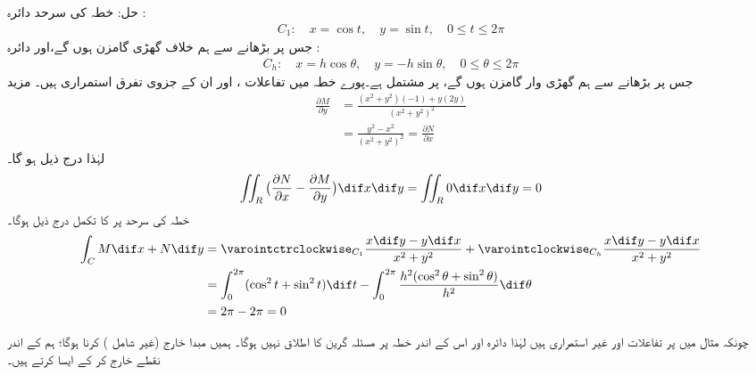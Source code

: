  حل:\quad
 خطہ   کی سرحد دائرہ :
\begin{align*}
 C_1:\quad  x=\cos t,\quad  y= \sin t,\quad 0\leq t \leq 2\pi 
\end{align*}
   جس پر    بڑھانے سے ہم  خلاف گھڑی گامزن ہوں گے،اور دائرہ :
\begin{align*}
  C_h:\quad  x=h\cos \theta,\quad  y= -h\sin\theta,\quad 0\leq \theta \leq 2\pi  
\end{align*}
جس پر    بڑھانے سے ہم  گھڑی وار  گامزن ہوں گے، پر مشتمل ہے۔پورے  خطہ  میں تفاعلات   ،   اور ان کے جزوی تفرق استمراری ہیں۔ مزید  
\begin{align*}
     \frac{\partial M}{\partial y} &= \frac{(x^2 + y^2)(-1) + y(2y)}{(x^2 + y^2)^2} \\     &= \frac{y^2 - x^2}{(x^2 + y^2)^2} = \frac{\partial N}{\partial x} 
\end{align*}
  لہٰذا  درج ذیل ہو گا۔
\begin{align*}
     \iint_R \big(\frac{\partial N}{\partial x} - \frac{\partial M}{\partial y}\big) \dif x \dif y = \iint_R 0 \dif x \dif y =0  
\end{align*}
 خطہ  کی سرحد پر   کا  تکمل  درج ذیل ہوگا۔ 
\begin{align*}
 \int_C M \dif x + N \dif y &= \varointctrclockwise_{C_1} \frac{x \dif y - y \dif x}{x^2 + y^2} + \varointclockwise_{C_h}  \frac{x \dif y - y \dif x}{x^2 + y^2} \\ 
 &= \int_0^{2\pi} (\cos^2{t} + \sin^2{t}) \dif t - \int_0^{2\pi} \frac{h^2 (\cos^2{\theta} + \sin^2{\theta})}{h^2} \dif \theta\\
  &= 2\pi - 2\pi =0  
\end{align*}

چونکہ مثال      میں  پر تفاعلات  اور   غیر استمراری ہیں لہٰذا دائرہ   اور اس کے اندر خطہ پر مسئلہ گرین کا اطلاق نہیں ہوگا۔ ہمیں  مبدا   خارج (غیر شامل ) کرنا ہوگا؛ ہم   کے اندر نقطے  خارج کر کے ایسا کرتے ہیں۔

